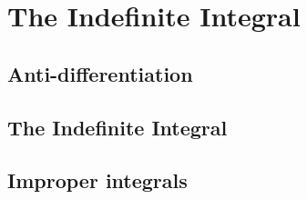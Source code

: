 \section{The Indefinite Integral}


\subsection{Anti-differentiation}





\subsection{The Indefinite Integral}


\subsection{Improper integrals}














